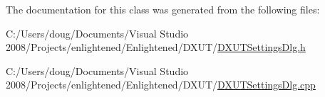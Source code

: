 The documentation for this class was generated from the following files:\begin{DoxyCompactItemize}
\item 
C:/Users/doug/Documents/Visual Studio 2008/Projects/enlightened/Enlightened/DXUT/\hyperlink{_d_x_u_t_settings_dlg_8h}{DXUTSettingsDlg.h}\item 
C:/Users/doug/Documents/Visual Studio 2008/Projects/enlightened/Enlightened/DXUT/\hyperlink{_d_x_u_t_settings_dlg_8cpp}{DXUTSettingsDlg.cpp}\end{DoxyCompactItemize}
